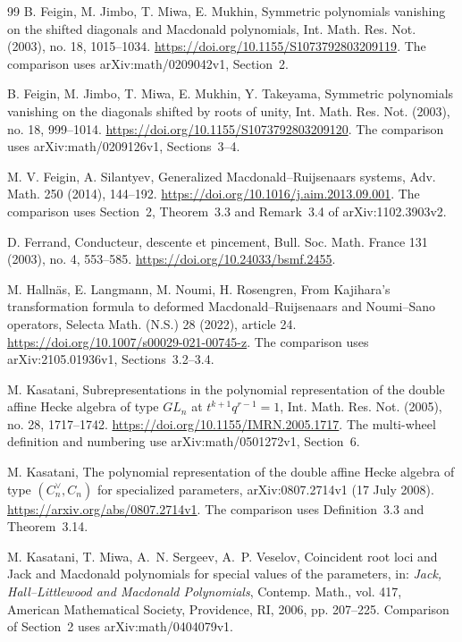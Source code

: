 \documentclass[10pt,fleqn]{article}
\numberwithin{equation}{section}
\begin{document}
\begin{thebibliography}{99}
B. Feigin, M. Jimbo, T. Miwa, E. Mukhin,
Symmetric polynomials vanishing on the shifted diagonals and Macdonald polynomials,
Int. Math. Res. Not. (2003), no. 18, 1015--1034.
\newblock \url{https://doi.org/10.1155/S1073792803209119}.
The comparison uses arXiv:math/0209042v1, Section~2.

B. Feigin, M. Jimbo, T. Miwa, E. Mukhin, Y. Takeyama,
Symmetric polynomials vanishing on the diagonals shifted by roots of unity,
Int. Math. Res. Not. (2003), no. 18, 999--1014.
\newblock \url{https://doi.org/10.1155/S1073792803209120}.
The comparison uses arXiv:math/0209126v1, Sections~3--4.

M. V. Feigin, A. Silantyev,
Generalized Macdonald--Ruijsenaars systems,
Adv. Math. 250 (2014), 144--192.
\newblock \url{https://doi.org/10.1016/j.aim.2013.09.001}.
\newblock The comparison uses Section~2, Theorem~3.3 and Remark~3.4
of arXiv:1102.3903v2.

D. Ferrand,
Conducteur, descente et pincement,
Bull. Soc. Math. France 131 (2003), no. 4, 553--585.
\newblock \url{https://doi.org/10.24033/bsmf.2455}.

M. Halln\"as, E. Langmann, M. Noumi, H. Rosengren,
From Kajihara's transformation formula to deformed Macdonald--Ruijsenaars
and Noumi--Sano operators,
Selecta Math. (N.S.) 28 (2022), article 24.
\newblock \url{https://doi.org/10.1007/s00029-021-00745-z}.
The comparison uses arXiv:2105.01936v1, Sections~3.2--3.4.

M. Kasatani,
Subrepresentations in the polynomial representation of the double affine Hecke
algebra of type $GL_n$ at $t^{k+1}q^{r-1}=1$,
Int. Math. Res. Not. (2005), no. 28, 1717--1742.
\newblock \url{https://doi.org/10.1155/IMRN.2005.1717}.
The multi-wheel definition and numbering use arXiv:math/0501272v1, Section~6.

M. Kasatani,
The polynomial representation of the double affine Hecke algebra of type
$(C_n^\vee,C_n)$ for specialized parameters,
arXiv:0807.2714v1 (17 July 2008).
\newblock \url{https://arxiv.org/abs/0807.2714v1}.
The comparison uses Definition~3.3 and Theorem~3.14.

M. Kasatani, T. Miwa,
A.~N. Sergeev, A.~P. Veselov,
Coincident root loci and Jack and Macdonald polynomials for special values
of the parameters,
in: \emph{Jack, Hall--Littlewood and Macdonald Polynomials},
Contemp. Math., vol. 417, American Mathematical Society, Providence, RI,
2006, pp. 207--225.
\newblock Comparison of Section~2 uses arXiv:math/0404079v1.


\end{thebibliography}
\end{document}
